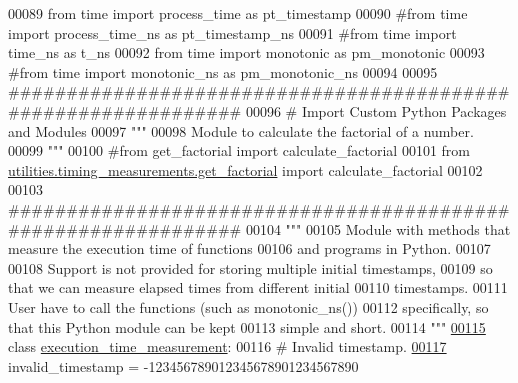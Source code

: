\begin{DoxyCode}
00089 \textcolor{keyword}{from} time \textcolor{keyword}{import} process\_time \textcolor{keyword}{as} pt\_timestamp
00090 \textcolor{comment}{#from time import process\_time\_ns as pt\_timestamp\_ns}
00091 \textcolor{comment}{#from time import time\_ns as t\_ns}
00092 \textcolor{keyword}{from} time \textcolor{keyword}{import} monotonic \textcolor{keyword}{as} pm\_monotonic
00093 \textcolor{comment}{#from time import monotonic\_ns as pm\_monotonic\_ns}
00094 
00095 \textcolor{comment}{###############################################################}
00096 \textcolor{comment}{#   Import Custom Python Packages and Modules}
00097 \textcolor{stringliteral}{"""}
00098 \textcolor{stringliteral}{    Module to calculate the factorial of a number.}
00099 \textcolor{stringliteral}{"""}
00100 \textcolor{comment}{#from get\_factorial import calculate\_factorial}
00101 \textcolor{keyword}{from} \hyperlink{namespaceutilities_1_1timing__measurements_1_1get__factorial}{utilities.timing\_measurements.get\_factorial} \textcolor{keyword}{import} 
      calculate\_factorial
00102 
00103 \textcolor{comment}{###############################################################}
00104 \textcolor{stringliteral}{"""}
00105 \textcolor{stringliteral}{    Module with methods that measure the execution time of functions}
00106 \textcolor{stringliteral}{        and programs in Python.}
00107 \textcolor{stringliteral}{}
00108 \textcolor{stringliteral}{    Support is not provided for storing multiple initial timestamps,}
00109 \textcolor{stringliteral}{        so that we can measure elapsed times from different initial}
00110 \textcolor{stringliteral}{        timestamps.}
00111 \textcolor{stringliteral}{        User have to call the functions (such as monotonic\_ns())}
00112 \textcolor{stringliteral}{            specifically, so that this Python module can be kept}
00113 \textcolor{stringliteral}{            simple and short.}
00114 \textcolor{stringliteral}{"""}
\hypertarget{performance__measurement__no__ns_8py_source_l00115}{}\hyperlink{classutilities_1_1timing__measurements_1_1performance__measurement__no__ns_1_1execution__time__measurement}{00115} \textcolor{keyword}{class }\hyperlink{classutilities_1_1timing__measurements_1_1performance__measurement__no__ns_1_1execution__time__measurement}{execution\_time\_measurement}:
00116     \textcolor{comment}{# Invalid timestamp.}
\hypertarget{performance__measurement__no__ns_8py_source_l00117}{}\hyperlink{classutilities_1_1timing__measurements_1_1performance__measurement__no__ns_1_1execution__time__measurement_ac0b6b9477824b6d0b0e1348864d55566}{00117}     invalid\_timestamp = -123456789012345678901234567890

\end{DoxyCode}
